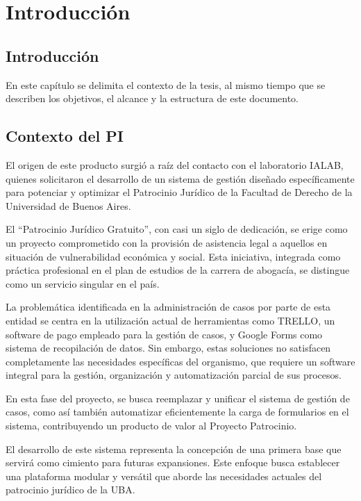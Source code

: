\chapter{Introducción}
\label{cap:introduccion}

\section{Introducción}
\label{sec:introduccion:intro}
En este capítulo se delimita el contexto de la tesis, al mismo tiempo que se describen los objetivos, el alcance y la estructura de este documento.

\section{Contexto del PI}
\label{sec:introduccion:contexto}
El origen de este producto surgió a raíz del contacto con el laboratorio IALAB, quienes solicitaron el desarrollo de un sistema de gestión diseñado específicamente para potenciar y optimizar el Patrocinio Jurídico de la Facultad de Derecho de la Universidad de Buenos Aires.

El ``Patrocinio Jurídico Gratuito'', con casi un siglo de dedicación, se erige como un proyecto comprometido con la provisión de asistencia legal a aquellos en situación de vulnerabilidad económica y social. Esta iniciativa, integrada como práctica profesional en el plan de estudios de la carrera de abogacía, se distingue como un servicio singular en el país.

La problemática identificada en la administración de casos por parte de esta entidad se centra en la utilización actual de herramientas como TRELLO, un software de pago empleado para la gestión de casos, y Google Forms como sistema de recopilación de datos. Sin embargo, estas soluciones no satisfacen completamente las necesidades específicas del organismo, que requiere un software integral para la gestión, organización y automatización parcial de sus procesos.

En esta fase del proyecto, se busca reemplazar y unificar el sistema de gestión de casos, como así también automatizar eficientemente la carga de formularios en el sistema, contribuyendo un producto de valor al Proyecto Patrocinio.

El desarrollo de este sistema representa la concepción de una primera base que servirá como cimiento para futuras expansiones. Este enfoque busca establecer una plataforma modular y versátil que aborde las necesidades actuales del patrocinio jurídico de la UBA.



